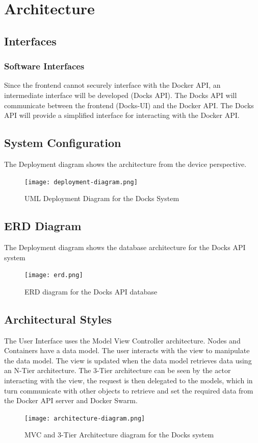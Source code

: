 \documentclass[]{article}
\begin{document}
\section{Architecture}
\subsection{Interfaces}
\subsubsection{Software Interfaces}
Since the frontend cannot securely interface with the Docker API,
an intermediate interface will be developed (Docks API).
The Docks API will communicate between the frontend (Docks-UI) and
the Docker API. The Docks API will provide a simplified interface for
interacting with the Docker API.


\subsection{System Configuration}
The Deployment diagram shows the architecture from the device perspective.

\begin{figure}[H]
	\centering
	\texttt{[image: deployment-diagram.png]}
	\caption{UML Deployment Diagram for the Docks System}
\end{figure}

\subsection{ERD Diagram}
The Deployment diagram shows the database architecture for the Docks API system

\begin{figure}[H]
	\centering
	\texttt{[image: erd.png]}
	\caption{ERD diagram for the Docks API database}
\end{figure}

\subsection{Architectural Styles}
The User Interface uses the Model View Controller architecture.
Nodes and Containers have a data model.
The user interacts with the view to manipulate the data model.
The view is updated when the data model retrieves data using an N-Tier architecture.
The 3-Tier architecture can be seen by the actor interacting with the view,
the request is then delegated to the models, which in turn
communicate with other objects to retrieve and set the required data from
the Docker API server and Docker Swarm.

\begin{figure}[h]
	\centering
	\texttt{[image: architecture-diagram.png]}
	\caption{MVC and 3-Tier Architecture diagram for the Docks system}
\end{figure}
\end{document}
